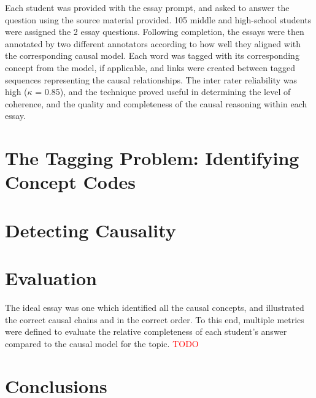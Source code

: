 \documentclass[runningheads,a4paper]{llncs}
\begin{document}
Each student was provided with the essay prompt, and asked to answer the
question using the source material provided. 105 middle and high-school students
were assigned the 2 essay questions. Following completion, the essays were then
annotated by two different annotators according to how well they aligned with
the corresponding causal model. Each word was tagged with its corresponding
concept from the model, if applicable, and links were created between tagged
sequences representing the causal relationships. The inter rater reliability was
high ($\kappa$ = 0.85), and the technique proved useful in determining the level
of coherence, and the quality and completeness of the causal reasoning within
each essay.


\section{The Tagging Problem: Identifying Concept Codes}


\section{Detecting Causality}

\section{Evaluation}
The ideal essay was one which identified all the causal concepts, and
illustrated the correct causal chains and in the correct order. To this end,
multiple metrics were defined to evaluate the relative completeness of each
student's answer compared to the causal model for the topic.
\textcolor{red}{TODO}

\section{Conclusions}



\end{document}

